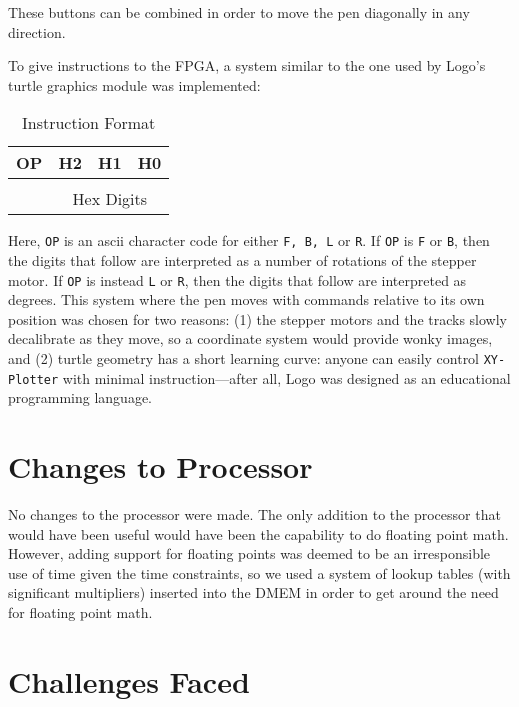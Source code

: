 \documentclass[12pt]{article}
\begin{document}
These buttons can be combined in order to move the pen diagonally in any direction.

To give instructions to the FPGA, a system similar to the one used by Logo's turtle graphics module was implemented:

\begin{table}[ht!]
\centering
\begin{tabular}{|c|c|c|c|} \hline
OP & H2 & H1 & H0 \\ \hline
\multicolumn{1}{c}{} & \multicolumn{3}{p{2cm}}{\raisebox{.5\baselineskip}{$\underbrace{\hspace{2.45cm}}$}} \\
\multicolumn{1}{c}{} & \multicolumn{3}{c}{Hex Digits} \\
\end{tabular}
\caption{Instruction Format}
\end{table}

Here, {\tt OP} is an ascii character code for either {\tt F, B, L} or {\tt R}. If {\tt OP} is {\tt F} or {\tt B}, then the digits that follow are interpreted as a number of rotations of the stepper motor. If {\tt OP} is instead {\tt L} or {\tt R}, then the digits that follow are interpreted as degrees. This system where the pen moves with commands relative to its own position was chosen for two reasons: (1) the stepper motors and the tracks slowly decalibrate as they move, so a coordinate system would provide wonky images, and (2) turtle geometry has a short learning curve: anyone can easily control {\tt XY-Plotter} with minimal instruction---after all, Logo was designed as an educational programming language.

\section{Changes to Processor}
No changes to the processor were made. The only addition to the processor that would have been useful would have been the capability to do floating point math. However, adding support for floating points was deemed to be an irresponsible use of time given the time constraints, so we used a system of lookup tables (with significant multipliers) inserted into the DMEM in order to get around the need for floating point math.

\section{Challenges Faced}
\end{document}
